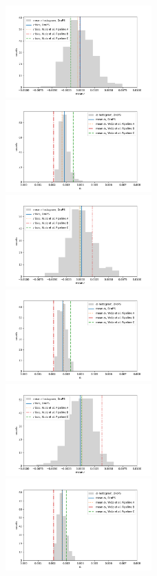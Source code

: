 \documentclass[12pt, a4paper]{ctexart} %
\begin{document}
\begin{figure}
  \includegraphics[width=0.5\textwidth]{d0s0_mean.png}%
  \includegraphics[width=0.5\textwidth]{d0s0_std.png}
  \includegraphics[width=0.5\textwidth]{d1s1_mean.png}%
  \includegraphics[width=0.5\textwidth]{d1s1_std.png}
  \includegraphics[width=0.5\textwidth]{dmsm_mean.png}%
  \includegraphics[width=0.5\textwidth]{dmsm_std.png}

\end{figure}
\end{document}
